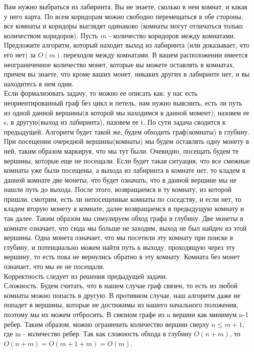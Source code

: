 \documentclass[12pt]{extreport}
\theoremstyle{definiton}
\theoremstyle{definition}
\theoremstyle{definition}
\let\leq\leqslant
\begin{document}
	\medskip
	
	\Pr[2] Вам нужно выбраться из лабиринта. Вы не знаете, сколько в нем комнат, и какая у него карта. По всем коридорам можно свободно перемещаться в обе стороны, все комнаты и коридоры выглядят одинаково (комнаты могут отличаться только количеством коридоров). Пусть $m$ - количество коридоров между комнатами. Предложите алгоритм, который находит выход из лабиринта (или доказывает, что его нет) за $O(m)$ переходов между комнатами. В вашем расположении имеется неограниченное количество монет, которые вы можете оставлять в комнатах, причем вы знаете, что кроме ваших монет, никаких других в лабиринте нет, и вы находитесь в нем одни.
	\newline
	\\Если формализовать задачу, то можно ее описать как: у нас есть неориентированный граф без цикл и петель, нам нужно выяснить, есть ли путь из одной данной вершины(в которой мы находимся в данной момент), назовем ее s, в другую(выход из лабиринта), назовем ее t. По сути задача сводится к предыдущей. Алгоритм будет такой же, будем обходить граф(комнаты) в глубину. При посещении очередной вершины(комнаты) мы будем оставлять одну монету в ней, таким образом маркируя, что мы тут были. Очевидно, посещать будем те вершины, которые еще не посещали. Если будет такая ситуация, что все смежные комнаты уже были посещены, а выхода из лабиринта в комнате нет, то  кладем в данной комнате две монеты, что будет означать, что в данной вершине мы не нашли путь до выхода. После этого, возвращаемся в ту комнату, из которой пришли, смотрим, есть ли непосещенные комнаты по соседству, и если нет, то кладем вторую монету в комнате, далее возвращаемся в предыдущую комнату и так далее. Таким образом мы симулируем обход графа в глубину. Две монеты в комнате означает, что сюда мы больше не заходим, выход не был найден из этой вершины. Одна монета означает, что мы посетили эту комнату при поиске в глубину, и потенциально можем найти путь к выходу, проходящую через эту вершину, то есть пока не вернулись обратно в эту комнату. Комната без монет означает, что мы ее не посещали.
	\\Корректность следует из решения предыдущей задачи.
	\\Сложность. Будем считать, что в нашем случае граф связен, то есть из любой комнаты можно попасть в другую. В противном случае, наш алгоритм даже не попадет в вершины, которые не достижимы из нашего начального положения, поэтому мы их можем отбросить. В связном графе из n вершин как минимум n-1 ребер. Таким образом, можно ограничить количество вершин сверху $n \leq m+1$, где m - количество ребер. Так как сложность обхода в глубину $O(n+m)$, то $O(n+m)=O(m+1+m)=O(m)$.
	
\end{document}
